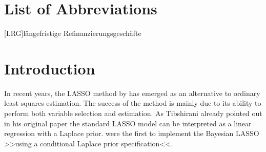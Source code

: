 \documentclass[12pt,a4paper]{article}
\begin{document}
\newpage
\listoffigures
{}

\listoftables
{}

\section*{List of Abbreviations}

\begin{adjustwidth}{1.5em}{0pt}

\begin{acronym}[dummyyyy]
 [LRG]{längefristige Refinanzierungsgeschäfte}

\end{acronym}

\end{adjustwidth}

\restoregeometry

\newpage
{} %

\hypertarget{introduction}{%
\section{Introduction}\label{introduction}}

In recent years, the \ac{LASSO} method by
\textcite{tibshirani_regression_1996} has emerged as an alternative to
ordinary least squares estimation. The success of the method is mainly
due to its ability to perform both variable selection and estimation. As
Tibshirani already pointed out in his original paper the standard
\ac{LASSO} model can be interpreted as a linear regression with a
Laplace prior. \textcite{park_bayesian_2008} were the first to implement
the Bayesian \ac{LASSO} \textgreater\textgreater using a conditional
Laplace prior specification\textless\textless.
\end{document}
